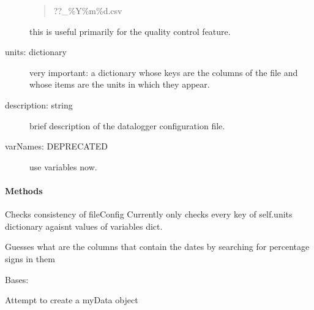 \documentclass[a4paper,10pt,english]{sphinxmanual}
\begin{document}
\begin{fulllineitems}
\begin{description}
\begin{quote}
??\_\%Y\%m\%d.csv
\end{quote}

this is useful primarily for the quality control feature.

\item[{units: dictionary}] \leavevmode
very important: a dictionary whose keys are the columns of the file and whose items are
the units in which they appear.

\item[{description: string}] \leavevmode
brief description of the datalogger configuration file.

\item[{varNames: DEPRECATED}] \leavevmode
use variables now.

\end{description}
\paragraph{Methods}

\begin{fulllineitems}
\label{pymicra:pymicra.core.fileConfig.check_consistency}
Checks consistency of fileConfig
Currently only checks every key of self.units dictionary agaisnt values of variables dict.

\end{fulllineitems}


\begin{fulllineitems}
\label{pymicra:pymicra.core.fileConfig.get_date_cols}
Guesses what are the columns that contain the dates by searching
for percentage signs in them

\end{fulllineitems}


\end{fulllineitems}


\begin{fulllineitems}
\label{pymicra:pymicra.core.myData}
Bases: 

Attempt to create a myData object

\end{fulllineitems}
\end{document}
